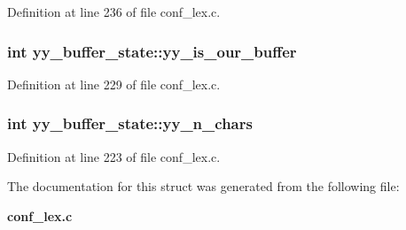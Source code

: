 Definition at line 236 of file conf\_\-lex.c.
\subsubsection[{yy\_\-is\_\-our\_\-buffer}]{\setlength{\rightskip}{0pt plus 5cm}int {\bf yy\_\-buffer\_\-state::yy\_\-is\_\-our\_\-buffer}}\label{structyy__buffer__state_a80ce2431c70dc4f89ced487f18449465}


Definition at line 229 of file conf\_\-lex.c.
\subsubsection[{yy\_\-n\_\-chars}]{\setlength{\rightskip}{0pt plus 5cm}int {\bf yy\_\-buffer\_\-state::yy\_\-n\_\-chars}}\label{structyy__buffer__state_a06406208824817acfec2183b79080945}


Definition at line 223 of file conf\_\-lex.c.

The documentation for this struct was generated from the following file:\begin{DoxyCompactItemize}
\item 
{\bf conf\_\-lex.c}\end{DoxyCompactItemize}
